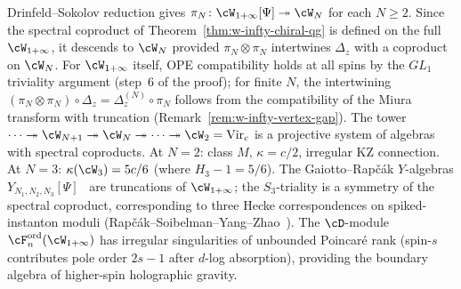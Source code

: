\begin{remark}[Descent to $\cW_N$]
\label{rem:w-infty-descent}
Drinfeld--Sokolov reduction gives
$\pi_N \colon \cW_{1+\infty}[\Psi]
\twoheadrightarrow \cW_N$
for each $N \geq 2$. Since the spectral coproduct of
Theorem~\ref{thm:w-infty-chiral-qg} is defined
on the full $\cW_{1+\infty}$, it descends to $\cW_N$
provided $\pi_N \otimes \pi_N$ intertwines $\Delta_z$ with
a coproduct on $\cW_N$. For $\cW_{1+\infty}$ itself,
OPE compatibility holds at all spins by the $GL_1$
triviality argument (step~6 of the proof); for finite
$N$, the intertwining $(\pi_N \otimes \pi_N) \circ
\Delta_z = \Delta_z^{(N)} \circ \pi_N$ follows from the
compatibility of the Miura transform with truncation
(Remark~\ref{rem:w-infty-vertex-gap}).
The tower
$\cdots \twoheadrightarrow \cW_{N+1}
\twoheadrightarrow \cW_N
\twoheadrightarrow \cdots
\twoheadrightarrow \cW_2 = \mathrm{Vir}_c$
is a projective system of algebras with spectral
coproducts.
At $N = 2$: class $M$, $\kappa = c/2$, irregular KZ
connection. At $N = 3$: $\kappa(\cW_3) = 5c/6$ (where
$H_3 - 1 = 5/6$).
The Gaiotto--Rap\v{c}\'ak $Y$-algebras
$Y_{N_1,N_2,N_3}[\Psi]$~\cite{gaiotto-rapchak} are truncations of
$\cW_{1+\infty}$; the $S_3$-triality is a symmetry
of the spectral coproduct, corresponding to three Hecke
correspondences on spiked-instanton moduli
(Rap\v{c}\'ak--Soibelman--Yang--Zhao~\cite{RSYZ20}).
The $\cD$-module $\cF_n^{\mathrm{ord}}(\cW_{1+\infty})$
has irregular singularities of unbounded Poincar\'e rank
(spin-$s$ contributes pole order $2s - 1$ after $d$-log
absorption), providing the boundary algebra of higher-spin
holographic gravity.
\end{remark}

